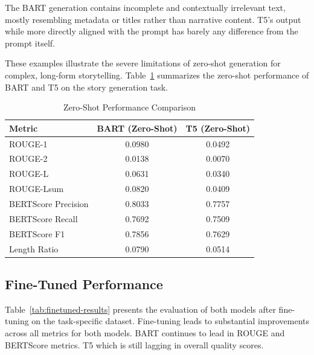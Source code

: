 \documentclass[11pt]{article}
\begin{document}
The BART generation contains incomplete and contextually irrelevant text, mostly resembling metadata or titles rather than narrative content. T5's output while more directly aligned with the prompt has barely any difference from the prompt itself. 

These examples illustrate the severe limitations of zero-shot generation for complex, long-form storytelling. Table~\ref{tab:zeroshot-results} summarizes the zero-shot performance of BART and T5 on the story generation task. 

\begin{table}[H]
\centering
\small
\setlength{\tabcolsep}{3pt} %
\caption{Zero-Shot Performance Comparison}
\begin{tabular}{lcc}
\toprule
\textbf{Metric} & \textbf{BART (Zero-Shot)} & \textbf{T5 (Zero-Shot)} \\
\midrule
ROUGE-1 & 0.0980 & 0.0492 \\
ROUGE-2 & 0.0138 & 0.0070 \\
ROUGE-L & 0.0631 & 0.0340 \\
ROUGE-Lsum & 0.0820 & 0.0409 \\
BERTScore Precision & 0.8033 & 0.7757 \\
BERTScore Recall & 0.7692 & 0.7509 \\
BERTScore F1 & 0.7856 & 0.7629 \\
Length Ratio & 0.0790 & 0.0514 \\
\bottomrule
\end{tabular}
\label{tab:zeroshot-results}
\end{table}

\subsection{Fine-Tuned Performance}
Table~\ref{tab:finetuned-results} presents the evaluation of both models after fine-tuning on the task-specific dataset. Fine-tuning leads to substantial improvements across all metrics for both models. 
BART continues to lead in ROUGE and BERTScore metrics. T5 which is still lagging in overall quality scores.
\end{document}
